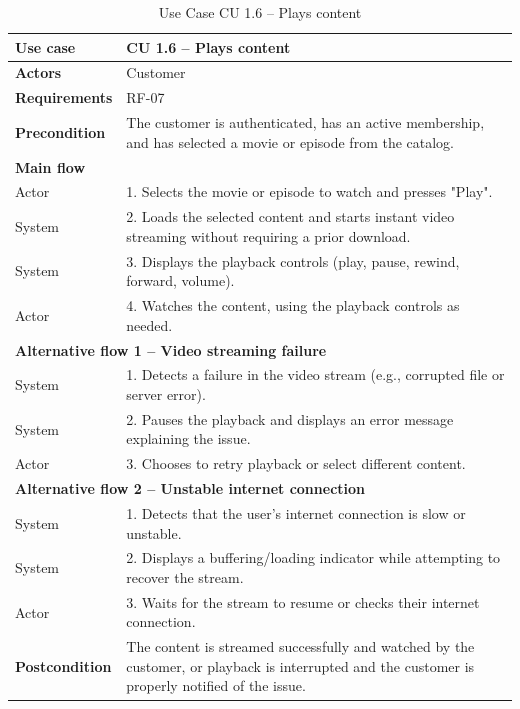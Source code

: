 \documentclass{article}
\begin{document}
\begin{table}[H]
\centering
\small
\renewcommand{\arraystretch}{1.35}
\caption{Use Case CU 1.6 -- Plays content}
\label{tab:cu1.6}
\begin{tabularx}{\textwidth}{|l|X|}
\hline
\textbf{Use case} & CU 1.6 -- Plays content \\ \hline
\textbf{Actors} & Customer \\ \hline
\textbf{Requirements} & RF-07 \\ \hline
\textbf{Precondition} & The customer is authenticated, has an active membership, and has selected a movie or episode from the catalog. \\ \hline
\multicolumn{2}{|l|}{\textbf{Main flow}} \\ \hline
Actor & 1. Selects the movie or episode to watch and presses "Play". \\ \hline
System & 2. Loads the selected content and starts instant video streaming without requiring a prior download. \\ \hline
System & 3. Displays the playback controls (play, pause, rewind, forward, volume). \\ \hline
Actor & 4. Watches the content, using the playback controls as needed. \\ \hline
\multicolumn{2}{|l|}{\textbf{Alternative flow 1 -- Video streaming failure}} \\ \hline
System & 1. Detects a failure in the video stream (e.g., corrupted file or server error). \\ \hline
System & 2. Pauses the playback and displays an error message explaining the issue. \\ \hline
Actor & 3. Chooses to retry playback or select different content. \\ \hline
\multicolumn{2}{|l|}{\textbf{Alternative flow 2 -- Unstable internet connection}} \\ \hline
System & 1. Detects that the user's internet connection is slow or unstable. \\ \hline
System & 2. Displays a buffering/loading indicator while attempting to recover the stream. \\ \hline
Actor & 3. Waits for the stream to resume or checks their internet connection. \\ \hline
\textbf{Postcondition} & The content is streamed successfully and watched by the customer, or playback is interrupted and the customer is properly notified of the issue. \\ \hline
\end{tabularx}
\end{table}
\end{document}
